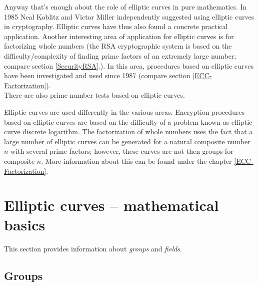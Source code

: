 Anyway that's enough about the role of elliptic curves in pure mathematics. 
In 1985 Neal Koblitz and Victor Miller
independently suggested using elliptic curves in cryptography. Elliptic 
curves have thus also found a concrete practical application. 
Another interesting area of application for elliptic curves is for
factorizing whole numbers  (the RSA cryptographic system
is based on the  difficulty/complexity of finding prime
factors of an extremely large number;  compare section \ref{SecurityRSA}.).
In this area, procedures based on elliptic curves have been investigated and
used since 1987 (compare section \ref{ECC-Factorization}). \\
There are also prime number tests based on elliptic
curves.

Elliptic curves are used differently in the various areas. Encryption
procedures based on elliptic curves are based on the difficulty of a problem
known as elliptic curve discrete logarithm.
The factorization of whole numbers uses the fact that a large number of
elliptic curves can be generated for a natural composite number $n$ with
several prime factors; however, these curves are not then groups for composite
$n$. More information about this can be found under the chapter \ref{ECC-Factorization}.

\section{Elliptic curves -- mathematical basics}

This section provides information about  {\em groups} and
 {\em fields}.

\subsection{Groups}

